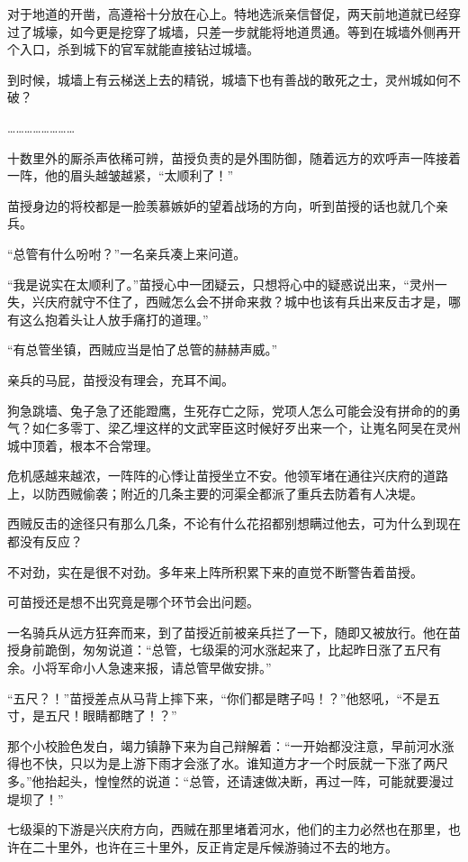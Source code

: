 对于地道的开凿，高遵裕十分放在心上。特地选派亲信督促，两天前地道就已经穿过了城壕，如今更是挖穿了城墙，只差一步就能将地道贯通。等到在城墙外侧再开个入口，杀到城下的官军就能直接钻过城墙。

到时候，城墙上有云梯送上去的精锐，城墙下也有善战的敢死之士，灵州城如何不破？

……………………

十数里外的厮杀声依稀可辨，苗授负责的是外围防御，随着远方的欢呼声一阵接着一阵，他的眉头越皱越紧，“太顺利了！”

苗授身边的将校都是一脸羡慕嫉妒的望着战场的方向，听到苗授的话也就几个亲兵。

“总管有什么吩咐？”一名亲兵凑上来问道。

“我是说实在太顺利了。”苗授心中一团疑云，只想将心中的疑惑说出来，“灵州一失，兴庆府就守不住了，西贼怎么会不拼命来救？城中也该有兵出来反击才是，哪有这么抱着头让人放手痛打的道理。”

“有总管坐镇，西贼应当是怕了总管的赫赫声威。”

亲兵的马屁，苗授没有理会，充耳不闻。

狗急跳墙、兔子急了还能蹬鹰，生死存亡之际，党项人怎么可能会没有拼命的的勇气？如仁多零丁、梁乙埋这样的文武宰臣这时候好歹出来一个，让嵬名阿吴在灵州城中顶着，根本不合常理。

危机感越来越浓，一阵阵的心悸让苗授坐立不安。他领军堵在通往兴庆府的道路上，以防西贼偷袭；附近的几条主要的河渠全都派了重兵去防着有人决堤。

西贼反击的途径只有那么几条，不论有什么花招都别想瞒过他去，可为什么到现在都没有反应？

不对劲，实在是很不对劲。多年来上阵所积累下来的直觉不断警告着苗授。

可苗授还是想不出究竟是哪个环节会出问题。

一名骑兵从远方狂奔而来，到了苗授近前被亲兵拦了一下，随即又被放行。他在苗授身前跪倒，匆匆说道：“总管，七级渠的河水涨起来了，比起昨日涨了五尺有余。小将军命小人急速来报，请总管早做安排。”

“五尺？！”苗授差点从马背上摔下来，“你们都是瞎子吗！？”他怒吼，“不是五寸，是五尺！眼睛都瞎了！？”

那个小校脸色发白，竭力镇静下来为自己辩解着：“一开始都没注意，早前河水涨得也不快，只以为是上游下雨才会涨了水。谁知道方才一个时辰就一下涨了两尺多。”他抬起头，惶惶然的说道：“总管，还请速做决断，再过一阵，可能就要漫过堤坝了！”

七级渠的下游是兴庆府方向，西贼在那里堵着河水，他们的主力必然也在那里，也许在二十里外，也许在三十里外，反正肯定是斥候游骑过不去的地方。


